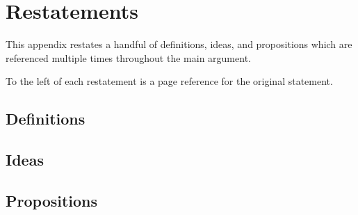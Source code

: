 \chapter{Restatements}
\label{cha:re}

\reversemarginpar

\begin{note}
  This appendix restates a handful of definitions, ideas, and propositions which are referenced multiple times throughout the main argument.

  To the left of each restatement is a page reference for the original statement.
\end{note}

\section{Definitions}
\label{sec:definitions}





\section{Ideas}
\label{sec:ideas}




\section{Propositions}
\label{sec:propositions}






